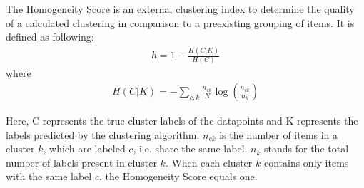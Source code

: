 The Homogeneity Score is an external clustering index to determine the quality of a calculated clustering in comparison to a preexisting grouping of items.
It is defined as following: \cite{rosenberg2007v}\\

\begin{align}
    h = 1 - \frac{H(C|K)}{H(C)}
\end{align}
where
\begin{align}
    H(C|K) = - \sum_{c,k} \frac{n_{ck}}{N}\log\left(\frac{n_{ck}}{n_k}\right)
\end{align}

Here, C represents the true cluster labels of the datapoints and K represents the labels predicted by the clustering algorithm. $n_{ck}$ is the number of items in a cluster $k$, which are labeled $c$, i.e. share the same label. $n_k$ stands for the total number of labels present in cluster $k$.
When each cluster $k$ contains only items with the same label $c$, the Homogeneity Score equals one.